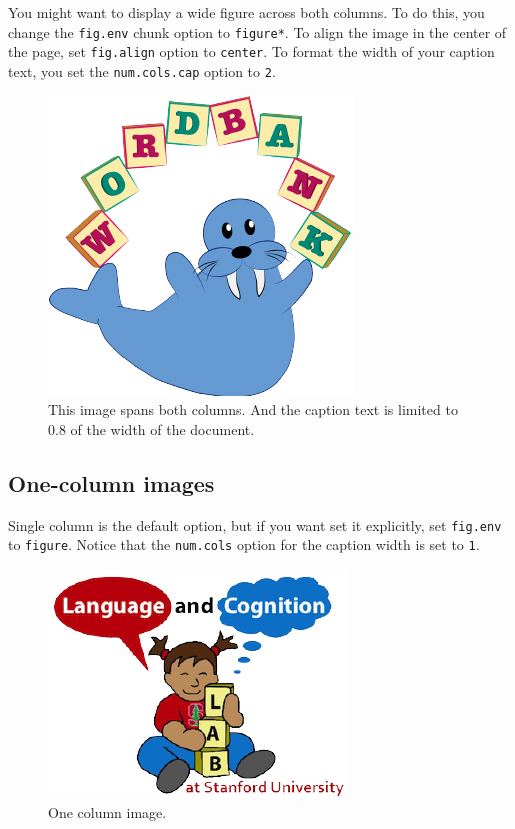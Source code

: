 \documentclass[10pt, letterpaper]{article}
\newenvironment{CodeChunk}{}{}
\begin{document}
You might want to display a wide figure across both columns. To do this,
you change the \texttt{fig.env} chunk option to \texttt{figure*}. To
align the image in the center of the page, set \texttt{fig.align} option
to \texttt{center}. To format the width of your caption text, you set
the \texttt{num.cols.cap} option to \texttt{2}.

\begin{CodeChunk}
\begin{figure}[h]

{\centering \includegraphics{figs/2-col-image-1} 

}

\caption[This image spans both columns]{This image spans both columns. And the caption text is limited to 0.8 of the width of the document.}\label{fig:2-col-image}
\end{figure}
\end{CodeChunk}

\hypertarget{one-column-images}{%
\subsection{One-column images}\label{one-column-images}}

Single column is the default option, but if you want set it explicitly,
set \texttt{fig.env} to \texttt{figure}. Notice that the
\texttt{num.cols} option for the caption width is set to \texttt{1}.

\begin{CodeChunk}
\begin{figure}[H]

{\centering \includegraphics{figs/image-1} 

}

\caption[One column image]{One column image.}\label{fig:image}
\end{figure}
\end{CodeChunk}
\end{document}
